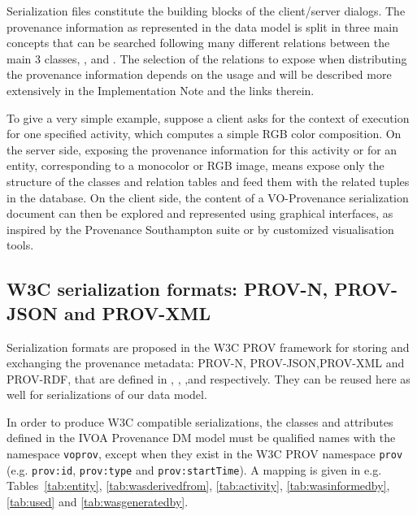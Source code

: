 
Serialization files constitute the building blocks of the client/server dialogs.
The provenance information as represented in the data model is split in three main concepts that can be searched following many different relations between the main 3 classes, ,  and .
The selection of the relations to expose when distributing the provenance information depends on the usage and will be described more extensively in the Implementation Note \citep{std:ProvenanceImplementationNote} and the links therein.

To give a very simple example, suppose a client asks for the context of execution for one specified activity, which computes a simple RGB color composition. 
On the server side, exposing the provenance information for this activity or for an entity, corresponding to a monocolor or RGB image, 
means expose only the structure of the classes
and relation tables and feed them with the related tuples in the database.
On the client side, the content of a VO-Provenance serialization document can then be explored and represented using graphical interfaces, as inspired by the Provenance Southampton suite or by customized visualisation tools.

\subsection{W3C serialization formats: PROV-N, PROV-JSON and PROV-XML}

Serialization formats are proposed in the W3C PROV framework for storing and exchanging the provenance metadata: {PROV-N}, {PROV-JSON},{PROV-XML} and PROV-RDF, that are defined in \cite{std:PROV-N}, \cite{std:PROV-JSON}, \cite{std:PROV-XML},and \cite{std:PROV-O} respectively. 
They can be reused here as well for serializations of our data model. 

In order to produce W3C compatible serializations, the classes and attributes defined in the IVOA Provenance DM model must be qualified names with the namespace \texttt{voprov}, except when they exist in the W3C PROV namespace \texttt{prov} (e.g. \texttt{prov:id}, \texttt{prov:type} and \texttt{prov:startTime}). A mapping is given in e.g. Tables~\ref{tab:entity}, \ref{tab:wasderivedfrom}, \ref{tab:activity}, \ref{tab:wasinformedby}, \ref{tab:used} and \ref{tab:wasgeneratedby}. 

